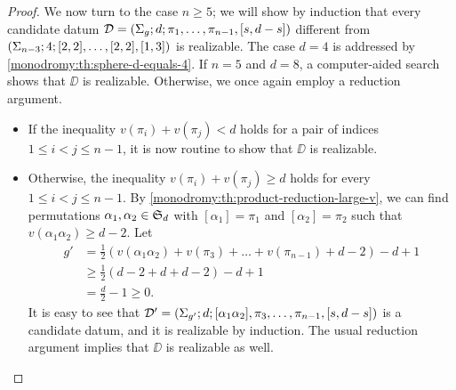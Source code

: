 \begin{proof}
We now turn to the case $n\ge 5$; we will show by induction that every candidate datum $\mathcal{D}=(\Sigma_{g};d;\pi_1,\ldots,\pi_{n-1},[s,d-s])$  different from $(\Sigma_{n-3};4;[2,2],\ldots,[2,2],[1,3])$ is realizable. The case $d=4$ is addressed by \cref{monodromy:th:sphere-d-equals-4}. If $n=5$ and $d=8$, a computer-aided search shows that $\DD$ is realizable. Otherwise, we once again employ a reduction argument.
\begin{itemize}
\item If the inequality $v(\pi_i)+v(\pi_j)<d$ holds for a pair of indices $1\le i<j\le n-1$, it is now routine to show that $\DD$ is realizable.
\item Otherwise, the inequality $v(\pi_i)+v(\pi_j)\ge d$ holds for every $1\le i<j\le n-1$. By \cref{monodromy:th:product-reduction-large-v}, we can find permutations $\alpha_1,\alpha_2\in\symgroup[d]$ with $[\alpha_1]=\pi_1$ and $[\alpha_2]=\pi_2$ such that $v(\alpha_1\alpha_2)\ge d-2$. Let
\begin{align*}
g'&=\frac{1}{2}(v(\alpha_1\alpha_2)+v(\pi_3)+\ldots+v(\pi_{n-1})+d-2)-d+1\\
&\ge\frac{1}{2}(d-2+d+d-2)-d+1\\
&=\frac{d}{2}-1\ge 0.
\end{align*}
It is easy to see that $\mathcal{D}'=(\Sigma_{g'};d;[\alpha_1\alpha_2],\pi_3,\ldots,\pi_{n-1},[s,d-s])$ is a candidate datum, and it is realizable by induction. The usual reduction argument implies that $\DD$ is realizable as well.\qedhere
\end{itemize}
\end{proof}